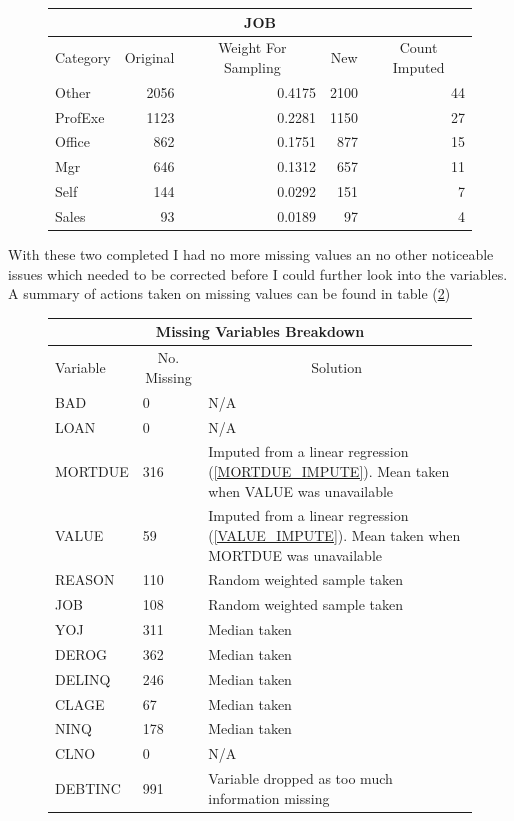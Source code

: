 \begin{figure}[ht]\label{JOB_IMPUTES}
	\centering
	\renewcommand{\arraystretch}{1.25}
	\begin{tabular}{lrrrr}
	\multicolumn{5}{c}{JOB}\\
	\hline
	Category & \multicolumn{1}{c}{Original} & \multicolumn{1}{c}{Weight For Sampling} & \multicolumn{1}{c}{New} & \multicolumn{1}{c}{Count Imputed} \\ 
	\hline
	Other & 2056 & 0.4175 & 2100 & 44 \\
	ProfExe & 1123 & 0.2281 & 1150 & 27 \\
	Office & 862 & 0.1751 & 877 & 15 \\
	Mgr & 646 & 0.1312 & 657  & 11 \\
	Self & 144 & 0.0292 & 151  & 7 \\
	Sales & 93 & 0.0189 & 97 & 4 \\
	\end{tabular}
\end{figure}

With these two completed I had no more missing values an no other noticeable issues which needed to be corrected before I could further look into the variables. A summary of actions taken on missing values can be found in table (\ref{data_clean})

\begin{figure}[ht]\label{data_clean}
	\centering
	\renewcommand{\arraystretch}{1.25}
	\begin{tabular}{l p{3cm} p{9cm}}
	\multicolumn{3}{c}{Missing Variables Breakdown}\\
	\hline
	Variable & \multicolumn{1}{c}{No. Missing} & \multicolumn{1}{c}{Solution}\\ 
	\hline
	BAD & 0 & N/A\\
	LOAN & 0 & N/A \\
	MORTDUE & 316 & Imputed from a linear regression (\ref{MORTDUE_IMPUTE}). Mean taken when VALUE was unavailable \\
	VALUE & 59 & Imputed from a linear regression (\ref{VALUE_IMPUTE}). Mean taken when MORTDUE was unavailable \\
	REASON & 110 & Random weighted sample taken \\
	JOB & 108 & Random weighted sample taken \\
	YOJ & 311 & Median taken\\
	DEROG & 362 & Median taken \\
	DELINQ & 246 & Median taken\\
	CLAGE & 67 & Median taken \\
	NINQ & 178 & Median taken\\
	CLNO & 0 & N/A \\
	DEBTINC & 991 & Variable dropped as too much information missing\\
	\end{tabular}
\end{figure}

